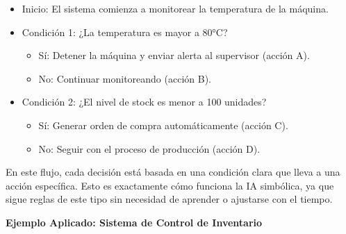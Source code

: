 \documentclass[
  10pt,
  letterpaper,
]{book}
\providecommand{\tightlist}{%
  \setlength{\itemsep}{0pt}\setlength{\parskip}{0pt}}\usepackage{longtable,booktabs,array}
\begin{document}
\begin{itemize}
\tightlist
\item
  Inicio: El sistema comienza a monitorear la temperatura de la máquina.
\item
  Condición 1: ¿La temperatura es mayor a 80°C?

  \begin{itemize}
  \tightlist
  \item
    Sí: Detener la máquina y enviar alerta al supervisor (acción A).
  \item
    No: Continuar monitoreando (acción B).
  \end{itemize}
\item
  Condición 2: ¿El nivel de stock es menor a 100 unidades?

  \begin{itemize}
  \tightlist
  \item
    Sí: Generar orden de compra automáticamente (acción C).
  \item
    No: Seguir con el proceso de producción (acción D).
  \end{itemize}
\end{itemize}

En este flujo, cada decisión está basada en una condición clara que
lleva a una acción específica. Esto es exactamente cómo funciona la IA
simbólica, ya que sigue reglas de este tipo sin necesidad de aprender o
ajustarse con el tiempo.

\textbf{Ejemplo Aplicado: Sistema de Control de Inventario}
\end{document}
